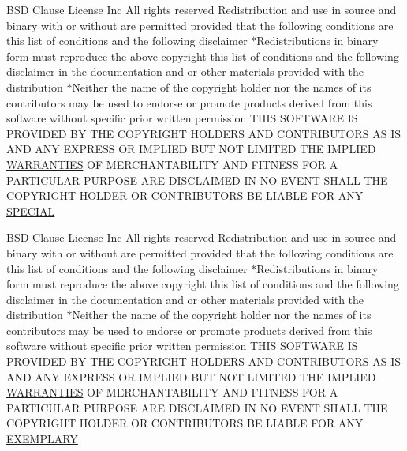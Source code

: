 \begin{DoxyCompactItemize}
\item 
B\+SD Clause License Inc All rights reserved Redistribution and use in source and binary with or without are permitted provided that the following conditions are this list of conditions and the following disclaimer $\ast$Redistributions in binary form must reproduce the above copyright this list of conditions and the following disclaimer in the documentation and or other materials provided with the distribution $\ast$Neither the name of the copyright holder nor the names of its contributors may be used to endorse or promote products derived from this software without specific prior written permission T\+H\+IS S\+O\+F\+T\+W\+A\+RE IS P\+R\+O\+V\+I\+D\+ED BY T\+HE C\+O\+P\+Y\+R\+I\+G\+HT H\+O\+L\+D\+E\+RS A\+ND C\+O\+N\+T\+R\+I\+B\+U\+T\+O\+RS AS IS A\+ND A\+NY E\+X\+P\+R\+E\+SS OR I\+M\+P\+L\+I\+ED B\+UT N\+OT L\+I\+M\+I\+T\+ED T\+HE I\+M\+P\+L\+I\+ED \hyperlink{LICENSE_8txt_a8472295fc7dc3e152751655a351cab17}{W\+A\+R\+R\+A\+N\+T\+I\+ES} OF M\+E\+R\+C\+H\+A\+N\+T\+A\+B\+I\+L\+I\+TY A\+ND F\+I\+T\+N\+E\+SS F\+OR A P\+A\+R\+T\+I\+C\+U\+L\+AR P\+U\+R\+P\+O\+SE A\+RE D\+I\+S\+C\+L\+A\+I\+M\+ED IN NO E\+V\+E\+NT S\+H\+A\+LL T\+HE C\+O\+P\+Y\+R\+I\+G\+HT H\+O\+L\+D\+ER OR C\+O\+N\+T\+R\+I\+B\+U\+T\+O\+RS BE L\+I\+A\+B\+LE F\+OR A\+NY \hyperlink{LICENSE_8txt_af45db6de18a60188d90a1c28a9cbb207}{S\+P\+E\+C\+I\+AL}
\item 
B\+SD Clause License Inc All rights reserved Redistribution and use in source and binary with or without are permitted provided that the following conditions are this list of conditions and the following disclaimer $\ast$Redistributions in binary form must reproduce the above copyright this list of conditions and the following disclaimer in the documentation and or other materials provided with the distribution $\ast$Neither the name of the copyright holder nor the names of its contributors may be used to endorse or promote products derived from this software without specific prior written permission T\+H\+IS S\+O\+F\+T\+W\+A\+RE IS P\+R\+O\+V\+I\+D\+ED BY T\+HE C\+O\+P\+Y\+R\+I\+G\+HT H\+O\+L\+D\+E\+RS A\+ND C\+O\+N\+T\+R\+I\+B\+U\+T\+O\+RS AS IS A\+ND A\+NY E\+X\+P\+R\+E\+SS OR I\+M\+P\+L\+I\+ED B\+UT N\+OT L\+I\+M\+I\+T\+ED T\+HE I\+M\+P\+L\+I\+ED \hyperlink{LICENSE_8txt_a8472295fc7dc3e152751655a351cab17}{W\+A\+R\+R\+A\+N\+T\+I\+ES} OF M\+E\+R\+C\+H\+A\+N\+T\+A\+B\+I\+L\+I\+TY A\+ND F\+I\+T\+N\+E\+SS F\+OR A P\+A\+R\+T\+I\+C\+U\+L\+AR P\+U\+R\+P\+O\+SE A\+RE D\+I\+S\+C\+L\+A\+I\+M\+ED IN NO E\+V\+E\+NT S\+H\+A\+LL T\+HE C\+O\+P\+Y\+R\+I\+G\+HT H\+O\+L\+D\+ER OR C\+O\+N\+T\+R\+I\+B\+U\+T\+O\+RS BE L\+I\+A\+B\+LE F\+OR A\+NY \hyperlink{LICENSE_8txt_a43c88664011ec4ec9fd41f9050dd8ffe}{E\+X\+E\+M\+P\+L\+A\+RY}

\end{DoxyCompactItemize}
